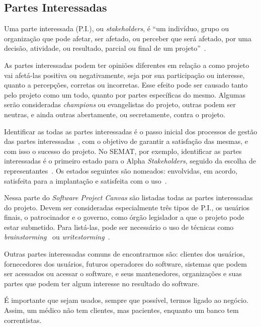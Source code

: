 \documentclass[fontsize=12pt, a4paper,pagesize=auto,toc=listof, ,twoside,chapterprefix=false,appendixprefix=true,open=right]{scrbook}
\begin{document}
\subsection{Partes Interessadas}

Uma parte interessada (P.I.), ou \textit{stakeholders}, é ``um indivíduo, grupo ou organização que pode afetar, ser afetado, ou perceber que será afetado, por uma decisão, atividade, ou resultado, parcial ou final de um projeto''~\citep{pmbok:6}.

As partes interessadas  podem ter opiniões diferentes em relação a como projeto vai afetá-las positiva ou negativamente, seja por sua participação ou interesse, quanto a percepções, corretas ou incorretas.
Esse efeito pode ser causado tanto pelo projeto como um todo, quanto por partes específicas do mesmo.
Algumas serão consideradas \textit{champions} ou evangelistas do projeto, outras podem ser neutras, e ainda outras abertamente, ou secretamente, contra o projeto.

Identificar as todas as partes interessadas é o passo inicial dos processos de gestão das partes interessadas~\citep{jacobson_essentials_2019,pmbok:6}, com o objetivo de garantir a satisfação das mesmas, e com isso o sucesso do projeto. No SEMAT, por exemplo, identificar as partes interessadas é o primeiro estado para o Alpha \textit{Stakeholders}, seguido da escolha de representantes~\citep{jacobson_essentials_2019}.  Os estados seguintes são nomeados: envolvidas, em acordo, satisfeita para a implantação e satisfeita com o uso~\citep{jacobson_essentials_2019}.

Nessa parte do \textit{Software Project Canvas} são listadas todas as partes interessadas  do projeto.
Devem ser consideradas especialmente três tipos de P.I., os usuários finais, o patrocinador e o governo, como órgão legislador a que o projeto pode estar submetido.
Para listá-las, pode ser necessário o uso de técnicas como \textit{brainstorming}~\citep{tracy:2015} ou \textit{writestorming}~\citep{gray:2010}.

Outras partes interessadas comuns de encontrarmos são: clientes dos usuários, fornecedores dos usuários, futuros operadores do software, sistemas que podem ser acessados ou acessar o software, e seus mantenedores, organizações e suas partes que podem ter algum interesse no resultado do software.

É importante que sejam usados, sempre que possível, termos ligado ao negócio.
 Assim, um médico não tem clientes, mas pacientes, enquanto um banco tem correntistas.
\end{document}
